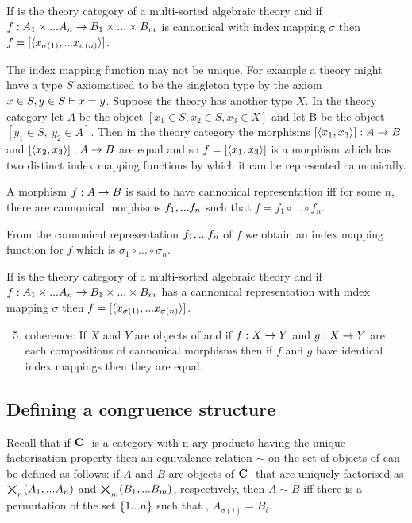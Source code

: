 \documentclass[10pt,a4paper]{scrartcl}
\begin{document}
\begin{observation}
If \catcw is the theory category of a multi-sorted algebraic theory and if
$f: A_1 \times ... A_n \rightarrow B_1 \times ... \times B_m$ is cannonical 
with index mapping $\sigma$ then $f=[\langle x_{\sigma(1)},...x_{\sigma(n)}\rangle]$.
\end{observation}

The index mapping function may not be unique.
For example a theory might have a type $S$ axiomatised to
be the singleton type by the axiom $x \in S, y \in S \vdash x=y$. Suppose
the theory has another type $X$. In the theory category let $A$ be the object $[x_1 \in S, x_2 \in S, x_3 \in X]$
and let B be the object $[y_1 \in S,\ y_2 \in A]$. 
Then in the theory category the morphisms
$[\langle x_1,x_3\rangle]:A \rightarrow B$
and $[\langle x_2,x_3\rangle]:A \rightarrow B$
are equal and so $f=[\langle x_1,x_3\rangle]$ is a morphism which has two distinct index mapping
functions by which it can be represented cannonically.

\begin{definition}
A morphism $f:A \rightarrow B$ is said to have cannonical representation iff for some $n$,
there are cannonical morphisms $f_1,...f_n$ such that $f=f_1 \circ ... \circ f_n$.
\end{definition}

From the cannonical representation $f_1,...f_n$ of $f$ we obtain an index mapping function 
for $f$ which is $\sigma_1 \circ ... \circ \sigma_n$. 

\begin{observation}
If \catcw is the theory category of a multi-sorted algebraic theory and if
$f: A_1 \times ... A_n \rightarrow B_1 \times ... \times B_m$ has a  cannonical 
representation 
with index mapping $\sigma$ then $f=[\langle x_{\sigma(1)},...x_{\sigma(n)}\rangle]$.
\end{observation}

\begin{enumerate}
\setcounter{enumi}{4}
\item coherence:
If $X$ and $Y$ are objects of \catcw and if $f:X \rightarrow Y$ and $g:X \rightarrow Y$ are
each compositions of cannonical morphisms then if $f$ and $g$ have identical 
index mappings then they are equal.
\end{enumerate}

\subsection{Defining a congruence structure}

Recall that if $\textbf{C}\ $ is a category with n-ary products having the unique factorisation property then an
equivalence relation  $\sim$ on the set of objects of \catcw can be defined as follows:
if $A$ and $B$ are objects of $\textbf{C}\ $ that are uniquely factorised as $\bigtimes_{n}(A_1,...A_n)$ and $\bigtimes_{m}(B_1,...B_m)$, respectively, then 
$A \sim B$ iff  there is a permutation of the set $\left\{1...n\right\}$ such that 
\foreachi, $A_{\sigma(i)}=B_i$. 
\end{document}
